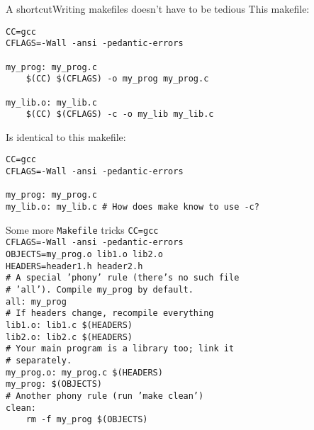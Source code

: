 \documentclass{beamer}
\begin{document}
\begin{frame}{A shortcut}{Writing makefiles doesn't have to be tedious}
\small
This makefile:

\texttt{CC=gcc \\
CFLAGS=-Wall -ansi -pedantic-errors \\
~\\
my\_prog: my\_prog.c \\
~~~~\$(CC) \$(CFLAGS) -o my\_prog my\_prog.c \\
~\\
my\_lib.o: my\_lib.c \\
~~~~\$(CC) \$(CFLAGS) -c -o my\_lib my\_lib.c \\
}

Is identical to this makefile:

\texttt{CC=gcc \\
CFLAGS=-Wall -ansi -pedantic-errors \\
~\\
my\_prog: my\_prog.c \\
my\_lib.o: my\_lib.c  \# How does make know to use -c?\\
}
\end{frame}

\begin{frame}{Some more \texttt{Makefile} tricks}
\footnotesize
\texttt{CC=gcc \\
CFLAGS=-Wall -ansi -pedantic-errors \\
OBJECTS=my\_prog.o lib1.o lib2.o \\
HEADERS=header1.h header2.h \\
\# A special 'phony' rule (there's no such file \\
\# 'all'). Compile my\_prog by default. \\
all: my\_prog \\
\# If headers change, recompile everything\\
lib1.o: lib1.c \$(HEADERS) \\
lib2.o: lib2.c \$(HEADERS) \\
\# Your main program is a library too; link it \\
\# separately. \\
my\_prog.o: my\_prog.c \$(HEADERS) \\
my\_prog: \$(OBJECTS) \\
\# Another phony rule (run 'make clean') \\
clean: \\
~~~~rm -f my\_prog \$(OBJECTS)
}
\end{frame}
\end{document}
